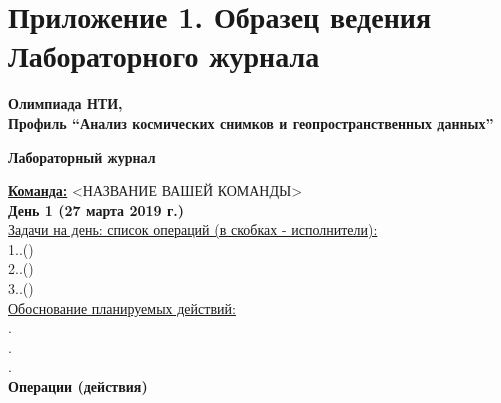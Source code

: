 \section*{Приложение 1. Образец ведения Лабораторного журнала }

\begin{center}
    \textbf{Олимпиада НТИ,\\Профиль “Анализ космических снимков и геопространственных данных”}
\end{center}

\begin{center}
    \textbf{Лабораторный журнал}
\end{center}

\noindent\textbf{\underline{Команда:}} <НАЗВАНИЕ ВАШЕЙ КОМАНДЫ>\\

\noindent\textbf{День 1 (27 марта 2019 г.)}\\

\noindent\underline{Задачи на день: список операций (в скобках - исполнители):}\\
1.\underline{\hspace{6cm}}.(\underline{\hspace{6cm}})\\
2.\underline{\hspace{6cm}}.(\underline{\hspace{6cm}})\\
3.\underline{\hspace{6cm}}.(\underline{\hspace{6cm}})\\

\noindent\underline{Обоснование планируемых действий:}\\
\underline{\hspace{9cm}}.\\
\underline{\hspace{9cm}}.\\
\underline{\hspace{9cm}}.\\

\textbf{Операции (действия)}

